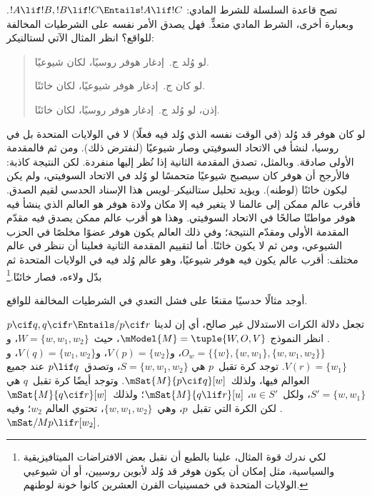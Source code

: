 \documentclass[../../../include/open-logic-section]{subfiles}
\begin{document}


تصح قاعدة السلسلة للشرط المادي:
$!A \lif !B, !B \lif !C \Entails !A \lif !C$. وبعبارة أخرى، الشرط
المادي متعدٍّ. فهل يصدق الأمر نفسه على الشرطيات المخالفة للواقع؟
انظر المثال الآتي لستالنيكر:
\begin{quote}
  لو وُلد ج.~إدغار هوفر روسيًا، لكان شيوعيًا.

  لو كان ج.~إدغار هوفر شيوعيًا، لكان خائنًا.

  إذن، لو وُلد ج.~إدغار هوفر روسيًا، لكان خائنًا.
\end{quote}
لو كان هوفر قد وُلد (في الوقت نفسه الذي وُلد فيه فعلًا) لا في الولايات
المتحدة بل في روسيا، لنشأ في الاتحاد السوفيتي وصار شيوعيًا (لنفترض
ذلك). ومن ثم فالمقدمة الأولى صادقة. وبالمثل، تصدق المقدمة الثانية إذا
نُظر إليها منفردة. لكن النتيجة كاذبة: فالأرجح أن هوفر كان سيصبح شيوعيًا
متحمسًا لو وُلد في الاتحاد السوفيتي، ولم يكن ليكون خائنًا (لوطنه).
ويؤيد تحليل ستالنيكر--لويس هذا الإسناد الحدسي لقيم الصدق. فأقرب عالم
ممكن إلى عالمنا لا يتغير فيه إلا مكان ولادة هوفر هو العالم الذي ينشأ
فيه هوفر مواطنًا صالحًا في الاتحاد السوفيتي. وهذا هو أقرب عالم ممكن
يصدق فيه مقدّم المقدمة الأولى ومقدّم النتيجة؛ وفي ذلك العالم يكون هوفر
عضوًا مخلصًا في الحزب الشيوعي، ومن ثم لا يكون خائنًا. أما لتقييم
المقدمة الثانية فعلينا أن ننظر في عالم مختلف: أقرب عالم يكون فيه هوفر
شيوعيًا، وهو عالم وُلد فيه في الولايات المتحدة ثم بدّل ولاءه، فصار
خائنًا.\footnote{لكي ندرك قوة المثال، علينا بالطبع أن نقبل بعض
  الافتراضات الميتافيزيقية والسياسية، مثل إمكان أن يكون هوفر قد وُلد
  لأبوين روسيين، أو أن شيوعيي الولايات المتحدة في خمسينيات القرن
  العشرين كانوا خونة لوطنهم.}

\begin{prob}
  أوجد مثالًا حدسيًا مقنعًا على فشل التعدي في الشرطيات المخالفة للواقع.
\end{prob}

\begin{ex}
  تجعل دلالة الكرات الاستدلال غير صالح، أي إن لدينا
  $p \cif q, q \cif r \Entails/ p \cif r$. انظر النموذج
  $\mModel{M} = \tuple{W, O, V}$، حيث~$W = \{w, w_1, w_2\}$،
  و$O_w = \{\{w\}, \{w, w_1\}, \{w, w_1, w_2\}\}$،
  و$V(p) = \{w_2\}$، و$V(q) = \{w_1, w_2\}$،
  و$V(r) = \{w_1\}$. توجد كرة تقبل~$p$ هي
  $S = \{w, w_1, w_2\}$، وتصدق~$p \lif q$ عند جميع العوالم فيها،
  ولذلك~$\mSat{M}{p \cif q}[w]$. وتوجد أيضًا كرة تقبل~$q$ هي
  $S' = \{w, w_1\}$، ولكل~$u \in S'$،
  $\mSat{M}{q \lif r}[u]$؛ ولذلك~$\mSat{M}{q \cif r}[w]$.
  لكن الكرة التي تقبل~$p$، وهي~$\{w, w_1, w_2\}$، تحتوي العالم
  $w_2$؛ وفيه~$\mSat/{M}{p \lif r}[w_2]$.
\end{ex}
\end{document}
